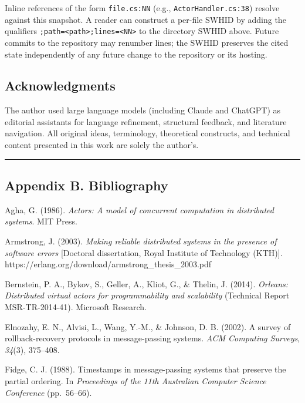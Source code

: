 \documentclass[
]{article}
\let\origtexttt\texttt%
\renewcommand{\texttt}[1]{\origtexttt{\seqsplit{#1}}}%
\let\texttt\origtexttt%
\begin{document}
Inline references of the form \texttt{file.cs:NN} (e.g.,
\texttt{ActorHandler.cs:38}) resolve against this snapshot. A reader can
construct a per-file SWHID by adding the qualifiers
\texttt{;path=\textless{}path\textgreater{};lines=\textless{}NN\textgreater{}}
to the directory SWHID above. Future commits to the repository may
renumber lines; the SWHID preserves the cited state independently of any
future change to the repository or its hosting.

\subsection{Acknowledgments}\label{acknowledgments}

The author used large language models (including Claude and ChatGPT) as
editorial assistants for language refinement, structural feedback, and
literature navigation. All original ideas, terminology, theoretical
constructs, and technical content presented in this work are solely the
author's.

\begin{center}\rule{0.5\linewidth}{0.5pt}\end{center}

\subsection{Appendix B. Bibliography}\label{appendix-b.-bibliography}

Agha, G. (1986). \emph{Actors: A model of concurrent computation in
distributed systems}. MIT Press.

Armstrong, J. (2003). \emph{Making reliable distributed systems in the
presence of software errors} {[}Doctoral dissertation, Royal Institute
of Technology (KTH){]}.
https://erlang.org/download/armstrong\_thesis\_2003.pdf

Bernstein, P. A., Bykov, S., Geller, A., Kliot, G., \& Thelin, J.
(2014). \emph{Orleans: Distributed virtual actors for programmability
and scalability} (Technical Report MSR-TR-2014-41). Microsoft Research.

Elnozahy, E. N., Alvisi, L., Wang, Y.-M., \& Johnson, D. B. (2002). A
survey of rollback-recovery protocols in message-passing systems.
\emph{ACM Computing Surveys}, \emph{34}(3), 375--408.

Fidge, C. J. (1988). Timestamps in message-passing systems that preserve
the partial ordering. In \emph{Proceedings of the 11th Australian
Computer Science Conference} (pp.~56--66).
\end{document}
